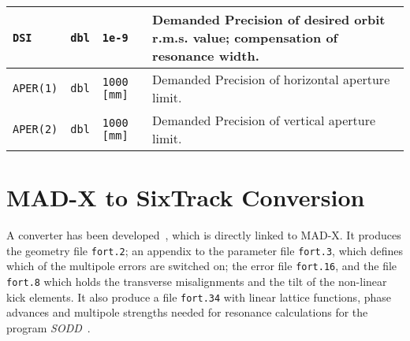 \begin{table}[h]
\begin{tabular}{|l|l|l|>{\raggedright\arraybackslash}p{10.2cm}|}
        \hline
        \texttt{DSI} & \texttt{dbl} & \texttt{1e-9} & Demanded Precision of desired orbit r.m.s. value; compensation of resonance width. \\
        \hline
        \texttt{APER(1)} & \texttt{dbl} & \texttt{1000 [mm]} & Demanded Precision of horizontal aperture limit. \\
        \hline
        \texttt{APER(2)} & \texttt{dbl} & \texttt{1000 [mm]} & Demanded Precision of vertical aperture limit. \\
        \hline
    \end{tabular}
\end{table}

\section{MAD-X to SixTrack Conversion} \label{MADT}

A converter has been developed~\cite{CONVERTOR}, which is directly linked to MAD-X\@.
It produces the geometry file \texttt{fort.2}; an appendix to the parameter file \texttt{fort.3}, which defines which of the multipole errors are switched on; the error file \texttt{fort.16}, and the file \texttt{fort.8} which holds the transverse misalignments and the tilt of the non-linear kick elements.
It also produce a file \texttt{fort.34} with linear lattice functions, phase advances and multipole strengths needed for resonance calculations for the program \textit{SODD}~\cite{SODD}.





